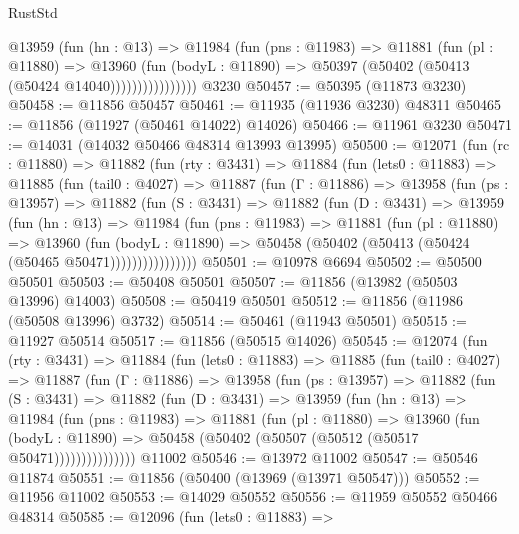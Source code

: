 \begin{lexlean}{RustStd}
\begin{coremodule}
                    @13959
                      (fun (hn : @13) =>
                      @11984
                        (fun (pns : @11983) =>
                        @11881
                          (fun (pl : @11880) =>
                          @13960
                            (fun (bodyL : @11890) =>
                            @50397 (@50402 (@50413 (@50424 @14040))))))))))))))))
    @3230
@50457 := @50395 (@11873 @3230)
@50458 := @11856 @50457
@50461 := @11935 (@11936 @3230) @48311
@50465 := @11856 (@11927 (@50461 @14022) @14026)
@50466 := @11961 @3230
@50471 := @14031 (@14032 @50466 @48314 @13993 @13995)
@50500 := @12071
    (fun (rc : @11880) =>
    @11882
      (fun (rty : @3431) =>
      @11884
        (fun (lets0 : @11883) =>
        @11885
          (fun (tail0 : @4027) =>
          @11887
            (fun (Γ : @11886) =>
            @13958
              (fun (ps : @13957) =>
              @11882
                (fun (S : @3431) =>
                @11882
                  (fun (D : @3431) =>
                  @13959
                    (fun (hn : @13) =>
                    @11984
                      (fun (pns : @11983) =>
                      @11881
                        (fun (pl : @11880) =>
                        @13960
                          (fun (bodyL : @11890) =>
                          @50458 (@50402 (@50413 (@50424 (@50465 @50471))))))))))))))))
@50501 := @10978 @6694
@50502 := @50500 @50501
@50503 := @50408 @50501
@50507 := @11856 (@13982 (@50503 @13996) @14003)
@50508 := @50419 @50501
@50512 := @11856 (@11986 (@50508 @13996) @3732)
@50514 := @50461 (@11943 @50501)
@50515 := @11927 @50514
@50517 := @11856 (@50515 @14026)
@50545 := @12074
    (fun (rty : @3431) =>
    @11884
      (fun (lets0 : @11883) =>
      @11885
        (fun (tail0 : @4027) =>
        @11887
          (fun (Γ : @11886) =>
          @13958
            (fun (ps : @13957) =>
            @11882
              (fun (S : @3431) =>
              @11882
                (fun (D : @3431) =>
                @13959
                  (fun (hn : @13) =>
                  @11984
                    (fun (pns : @11983) =>
                    @11881
                      (fun (pl : @11880) =>
                      @13960
                        (fun (bodyL : @11890) =>
                        @50458 (@50402 (@50507 (@50512 (@50517 @50471)))))))))))))))
    @11002
@50546 := @13972 @11002
@50547 := @50546 @11874
@50551 := @11856 (@50400 (@13969 (@13971 @50547)))
@50552 := @11956 @11002
@50553 := @14029 @50552
@50556 := @11959 @50552 @50466 @48314
@50585 := @12096
    (fun (lets0 : @11883) =>

\end{coremodule}
\end{lexlean}

